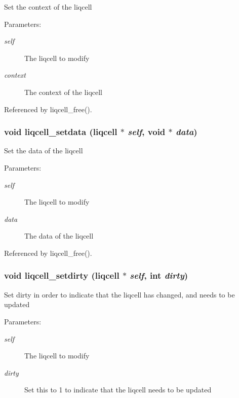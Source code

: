 Set the context of the liqcell \begin{Desc}
\item[Parameters:]
\begin{description}
\item[{\em self}]The liqcell to modify \item[{\em context}]The context of the liqcell \end{description}
\end{Desc}


Referenced by liqcell\_\-free().
\subsubsection[{liqcell\_\-setdata}]{\setlength{\rightskip}{0pt plus 5cm}void liqcell\_\-setdata (liqcell $\ast$ {\em self}, \/  void $\ast$ {\em data})}\label{d5/da2/liqcell_8c_35b8154d56ab84d8073d5929ecec899e}


Set the data of the liqcell \begin{Desc}
\item[Parameters:]
\begin{description}
\item[{\em self}]The liqcell to modify \item[{\em data}]The data of the liqcell \end{description}
\end{Desc}


Referenced by liqcell\_\-free().
\subsubsection[{liqcell\_\-setdirty}]{\setlength{\rightskip}{0pt plus 5cm}void liqcell\_\-setdirty (liqcell $\ast$ {\em self}, \/  int {\em dirty})}\label{d5/da2/liqcell_8c_6b32b411a9291f4a98c29b9e23007ce5}


Set dirty in order to indicate that the liqcell has changed, and needs to be updated \begin{Desc}
\item[Parameters:]
\begin{description}
\item[{\em self}]The liqcell to modify \item[{\em dirty}]Set this to 1 to indicate that the liqcell needs to be updated \end{description}
\end{Desc}


